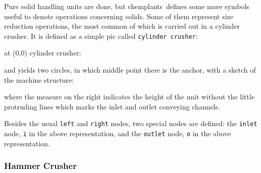 \documentclass[12pt]{article}						%
\newcommand*{\chpn}[1]{\texttt{#1}}				%
\newcommand*{\chpp}[1]{\texttt{#1}}				%
\newcommand*{\chemplants}{chemplants}
\begin{document}
Pure solid handling units are done, but \chemplants\ defines some more symbols
useful to denote operations concerning solids. Some of them represent size
reduction operations, the most common of which is carried out in a cylinder
crusher. It is defined as a simple pic called \chpp{cylinder crusher}:
\begin{chpcode}
	\pic at (0,0) {cylinder crusher};
\end{chpcode}
and yields two circles, in which middle point there is the anchor, with a sketch
of the machine structure:
\begin{center}
\end{center}
where the measure on the right indicates the height of the unit without the
little protruding lines which marks the inlet and outlet conveying channels.

Besides the usual \chpn{left} and \chpn{right} nodes, two special nodes are
defined: the \chpn{inlet} node, \chpn{i} in the above representation, and the
\chpn{outlet} node, \chpn{o} in the above representation.

\subsubsection{Hammer Crusher}
\end{document}
